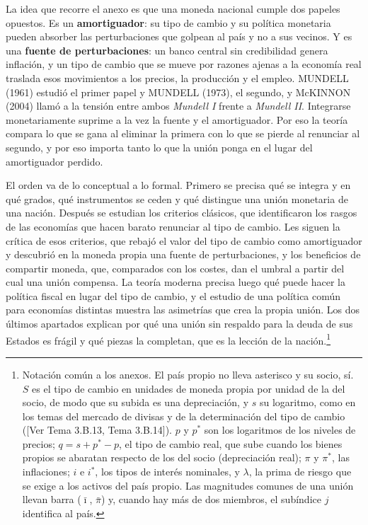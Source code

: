\documentclass[10pt,a4paper]{article}
\newcommand{\authorfont}[1]{{\fontfamily{EBGaramond-TLF}\selectfont #1}}
\newcounter{anexo}
\begin{document}
La idea que recorre el anexo es que una moneda nacional cumple dos papeles opuestos. Es un \textbf{amortiguador}: su tipo de cambio y su política monetaria pueden absorber las perturbaciones que golpean al país y no a sus vecinos. Y es una \textbf{fuente de perturbaciones}: un banco central sin credibilidad genera inflación, y un tipo de cambio que se mueve por razones ajenas a la economía real traslada esos movimientos a los precios, la producción y el empleo. MUNDELL (1961) estudió el primer papel y MUNDELL (1973), el segundo, y McKINNON (2004) llamó a la tensión entre ambos \textit{Mundell I} frente a \textit{Mundell II}. Integrarse monetariamente suprime a la vez la fuente y el amortiguador. Por eso la teoría compara lo que se gana al eliminar la primera con lo que se pierde al renunciar al segundo, y por eso importa tanto lo que la unión ponga en el lugar del amortiguador perdido.

El orden va de lo conceptual a lo formal. Primero se precisa qué se integra y en qué grados, qué instrumentos se ceden y qué distingue una unión monetaria de una nación. Después se estudian los criterios clásicos, que identificaron los rasgos de las economías que hacen barato renunciar al tipo de cambio. Les siguen la crítica de esos criterios, que rebajó el valor del tipo de cambio como amortiguador y descubrió en la moneda propia una fuente de perturbaciones, y los beneficios de compartir moneda, que, comparados con los costes, dan el umbral a partir del cual una unión compensa. La teoría moderna precisa luego qué puede hacer la política fiscal en lugar del tipo de cambio, y el estudio de una política común para economías distintas muestra las asimetrías que crea la propia unión. Los dos últimos apartados explican por qué una unión sin respaldo para la deuda de sus Estados es frágil y qué piezas la completan, que es la lección de la nación.\footnote{%
    Notación común a los anexos. El país propio no lleva asterisco y su socio, sí. $S$ es el tipo de cambio en unidades de moneda propia por unidad de la del socio, de modo que su subida es una depreciación, y $s$ su logaritmo, como en los temas del mercado de divisas y de la determinación del tipo de cambio ([\authorfont{Ver Tema 3.B.13, Tema 3.B.14}]). $p$ y $p^*$ son los logaritmos de los niveles de precios; $q=s+p^*-p$, el tipo de cambio real, que sube cuando los bienes propios se abaratan respecto de los del socio (depreciación real); $\pi$ y $\pi^*$, las inflaciones; $i$ e $i^*$, los tipos de interés nominales, y $\lambda$, la prima de riesgo que se exige a los activos del país propio. Las magnitudes comunes de una unión llevan barra ($\bar\imath$, $\bar\pi$) y, cuando hay más de dos miembros, el subíndice $j$ identifica al país.
}
\end{document}
